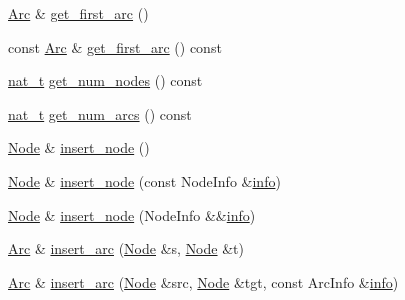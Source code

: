 \begin{DoxyCompactItemize}
\item 
\hyperlink{class_designar_1_1_graph_a74c730ef4ce2d20f998d72bd25c2b5bf}{Arc} \& \hyperlink{class_designar_1_1_graph_a6829f963f0db1fffbc535557f39ed877}{get\+\_\+first\+\_\+arc} ()
\item 
const \hyperlink{class_designar_1_1_graph_a74c730ef4ce2d20f998d72bd25c2b5bf}{Arc} \& \hyperlink{class_designar_1_1_graph_a3a4be7fef798a957b0a66102f1d30c39}{get\+\_\+first\+\_\+arc} () const
\item 
\hyperlink{namespace_designar_aa72662848b9f4815e7bf31a7cf3e33d1}{nat\+\_\+t} \hyperlink{class_designar_1_1_graph_af6f0ef48386dd1353880ff706387c4e8}{get\+\_\+num\+\_\+nodes} () const
\item 
\hyperlink{namespace_designar_aa72662848b9f4815e7bf31a7cf3e33d1}{nat\+\_\+t} \hyperlink{class_designar_1_1_graph_a5b155eda66a4c90f6a34b25c80d9342b}{get\+\_\+num\+\_\+arcs} () const
\item 
\hyperlink{class_designar_1_1_graph_a5dfc7dba9d092ac489c72e40390c37d0}{Node} \& \hyperlink{class_designar_1_1_graph_a5da24cc7de9ae39b1df684cb75782fed}{insert\+\_\+node} ()
\item 
\hyperlink{class_designar_1_1_graph_a5dfc7dba9d092ac489c72e40390c37d0}{Node} \& \hyperlink{class_designar_1_1_graph_a573d7ab63075e30bc8c5aaa2a80548ec}{insert\+\_\+node} (const Node\+Info \&\hyperlink{class_designar_1_1_graph_a2a8b41ce641ad2fb1b84a4d6b024bb1a}{info})
\item 
\hyperlink{class_designar_1_1_graph_a5dfc7dba9d092ac489c72e40390c37d0}{Node} \& \hyperlink{class_designar_1_1_graph_abbf6788c27f9719907d31fe7f7a83920}{insert\+\_\+node} (Node\+Info \&\&\hyperlink{class_designar_1_1_graph_a2a8b41ce641ad2fb1b84a4d6b024bb1a}{info})
\item 
\hyperlink{class_designar_1_1_graph_a74c730ef4ce2d20f998d72bd25c2b5bf}{Arc} \& \hyperlink{class_designar_1_1_graph_a794e687e21db6f4e00e14c6bdc5c2907}{insert\+\_\+arc} (\hyperlink{class_designar_1_1_graph_a5dfc7dba9d092ac489c72e40390c37d0}{Node} \&s, \hyperlink{class_designar_1_1_graph_a5dfc7dba9d092ac489c72e40390c37d0}{Node} \&t)
\item 
\hyperlink{class_designar_1_1_graph_a74c730ef4ce2d20f998d72bd25c2b5bf}{Arc} \& \hyperlink{class_designar_1_1_graph_ad310a106f10d0a7ff12915d8b47e8e3d}{insert\+\_\+arc} (\hyperlink{class_designar_1_1_graph_a5dfc7dba9d092ac489c72e40390c37d0}{Node} \&src, \hyperlink{class_designar_1_1_graph_a5dfc7dba9d092ac489c72e40390c37d0}{Node} \&tgt, const Arc\+Info \&\hyperlink{class_designar_1_1_graph_a2a8b41ce641ad2fb1b84a4d6b024bb1a}{info})

\end{DoxyCompactItemize}
